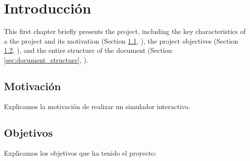 \chead[]{}
\renewcommand{\headrulewidth}{0.5pt}

\lfoot[]{}
\cfoot[]{}
\rfoot[]{}
\renewcommand{\footrulewidth}{0pt}

\chapter{Introducción}
\label{ch:introduction}

This first chapter briefly presents the project, including the key characteristics of a the project and its motivation (Section \ref{sec:background_and_motivation}, \textit{}), the project objectives (Section \ref{sec:objectives}, \textit{}), and the entire structure of the document (Section \ref{sec:document_structure}, \textit{}).

\section{Motivación}
\label{sec:background_and_motivation}
Explicamos la motivación de realizar un simulador interactivo.



\section{Objetivos}
\label{sec:objectives}

Explicamos los objetivos que ha tenido el proyecto:

